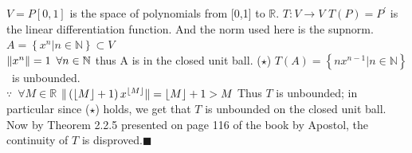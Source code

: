 \documentclass[12pt]{article}
\newcommand{\N}{\mathbb{N}}
\newcommand{\R}{\mathbb{R}}
\begin{document}
	
	$V=P[0,1]$ is the space of polynomials from [0,1] to $ \R $. \newline
	$T:V\rightarrow V$ \quad $T(P)=P^\prime$ \quad is the linear differentiation function. \newline
	And the norm used here is the supnorm. \newline
	\quad \newline
	$A= \left\{ x^n|n\in \N\right\} \subset V$ \vspace{5pt} \\
	\phantom{\quad \, \,}$\Arrowvert x^n \Arrowvert = 1 \, \, \, \forall n \in \N$ \quad thus A is in the closed unit ball. ($\star$) \newline
	\quad \newline
	$T(A)=\left\{nx^{n-1}|n\in \N \right\}$ \, is unbounded. \vspace{5pt} \\
	\phantom{\quad \, \,} $\because \, \, \, \forall M \in \R$ \quad 
	$ \Arrowvert \left( \lfloor M \rfloor +1 \right) x^{ \lfloor M \rfloor } \Arrowvert  = \lfloor M \rfloor +1 > M $ \newline
	\quad \newline
	Thus $T$ is unbounded;
	in particular since ($\star$) holds, we get that $T$ is unbounded on the closed unit ball. \newline
	Now by Theorem 2.2.5 presented on page 116 of the book by Apostol\cite{apostol}, the continuity of $T$ is disproved.\hfill$\blacksquare$ \newline
	\quad	 \newline
	\newline
\end{document}
